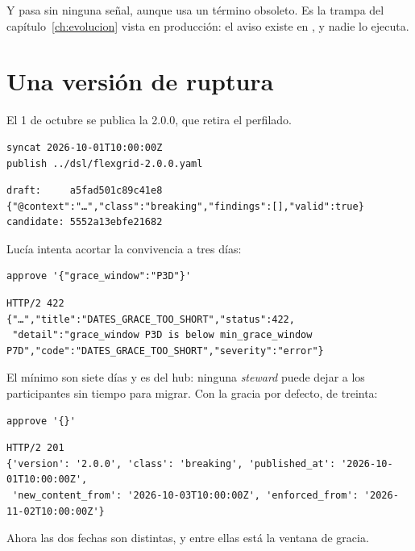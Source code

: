 Y  pasa sin ninguna señal, aunque usa un término obsoleto. Es la trampa del
capítulo~\ref{ch:evolucion} vista en producción: el aviso existe en , y nadie lo ejecuta.

\section{Una versión de ruptura}

El 1 de octubre se publica la 2.0.0, que retira el perfilado.

\begin{lstlisting}[style=sh]
syncat 2026-10-01T10:00:00Z
publish ../dsl/flexgrid-2.0.0.yaml
\end{lstlisting}
\begin{lstlisting}[style=out]
draft:     a5fad501c89c41e8
{"@context":"…","class":"breaking","findings":[],"valid":true}
candidate: 5552a13ebfe21682
\end{lstlisting}

Lucía intenta acortar la convivencia a tres días:

\begin{lstlisting}[style=sh]
approve '{"grace_window":"P3D"}'
\end{lstlisting}
\begin{lstlisting}[style=out]
HTTP/2 422
{"…","title":"DATES_GRACE_TOO_SHORT","status":422,
 "detail":"grace_window P3D is below min_grace_window P7D","code":"DATES_GRACE_TOO_SHORT","severity":"error"}
\end{lstlisting}

El mínimo son siete días y es del hub: ninguna \emph{steward} puede dejar a los participantes sin tiempo para
migrar. Con la gracia por defecto, de treinta:

\begin{lstlisting}[style=sh]
approve '{}'
\end{lstlisting}
\begin{lstlisting}[style=out]
HTTP/2 201
{'version': '2.0.0', 'class': 'breaking', 'published_at': '2026-10-01T10:00:00Z',
 'new_content_from': '2026-10-03T10:00:00Z', 'enforced_from': '2026-11-02T10:00:00Z'}
\end{lstlisting}

Ahora las dos fechas son distintas, y entre ellas está la ventana de gracia.

